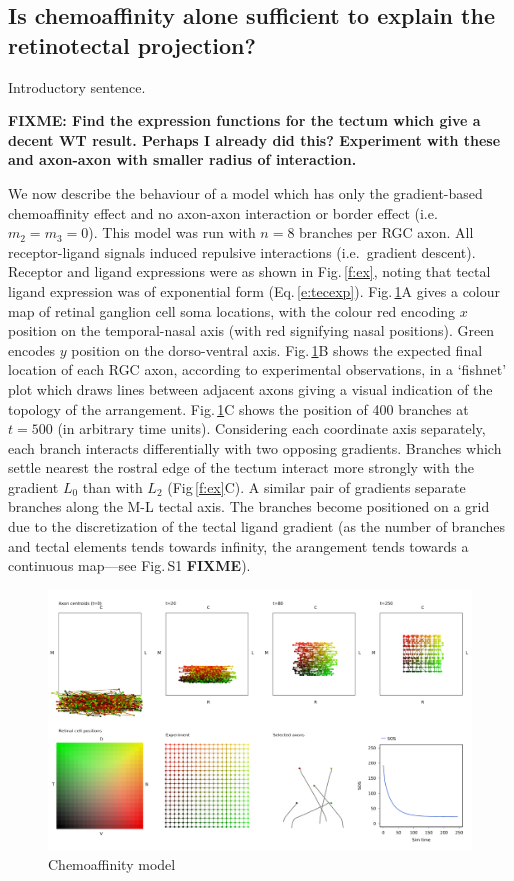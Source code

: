 \documentclass[11pt, a4paper]{article}
\begin{document}
\subsection*{Is chemoaffinity alone sufficient to explain the retinotectal projection?}

Introductory sentence.

\textbf{FIXME: Find the expression functions for the tectum which give a
decent WT result. Perhaps I already did this? Experiment with these and
axon-axon with smaller radius of interaction.}

We now describe the behaviour of a model which has only the gradient-based
chemoaffinity effect and no axon-axon interaction or border effect
(i.e.~$m_2=m_3=0$). This model was run with $n=8$ branches per RGC axon. All
receptor-ligand signals induced repulsive interactions (i.e.~gradient
descent). Receptor and ligand expressions were as shown in Fig.\,\ref{f:ex},
noting that tectal ligand expression was of exponential form
(Eq.\,\ref{e:tecexp}). Fig.\,\ref{f:ch}A gives a colour map of retinal
ganglion cell soma locations, with the colour red encoding $x$ position on the
temporal-nasal axis (with red signifying nasal positions). Green encodes $y$
position on the dorso-ventral axis.
%
Fig.\,\ref{f:ch}B shows the expected final location of each RGC axon,
according to experimental observations, in a `fishnet' plot which draws lines
between adjacent axons giving a visual indication of the topology of the
arrangement.
%
Fig.\,\ref{f:ch}C shows the position of
400 branches at $t=500$ (in arbitrary time units). Considering each
coordinate axis separately, each branch interacts differentially with two
opposing gradients. Branches which settle nearest the rostral edge of the
tectum interact more strongly with the gradient $L_0$ than with $L_2$
(Fig\,\ref{f:ex}C). A similar pair of gradients separate branches along the
M-L tectal axis. The branches become positioned on a grid due to the
discretization of the tectal ligand gradient (as the number of branches and
tectal elements tends towards infinity, the arangement tends towards a
continuous map---see Fig.\,S1 \textbf{FIXME}).

\begin{figure}
\includegraphics[width=\linewidth]{./images/j4_ee_chemoonly_wt_chemoonly.png}
\caption{Chemoaffinity model}
\label{f:ch}
\end{figure}
\end{document}
